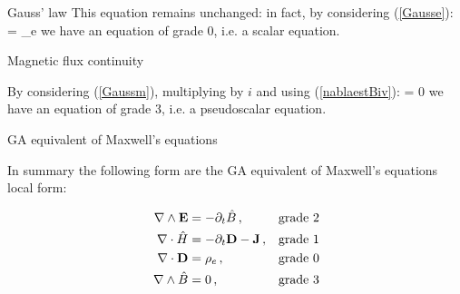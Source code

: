 \documentclass[handout,10pt]{beamer}
\begin{document}
\begin{frame}[fragile]{}
\alert{Gauss' law}
This equation remains unchanged: in fact, by considering (\ref{Gausse}):
%
\be
\nabla \cdot \BD =  \rho_e 
\ee
%
we have an \alert{equation of grade 0, i.e. a scalar equation}.

\pause
\alert{Magnetic flux continuity}

By considering (\ref{Gaussm}), multiplying by $i$ and using (\ref{nablaestBiv}):
%
\be
\nabla \wedge \hB =  0 
\ee
%
we have an \alert{equation of grade 3, i.e. a pseudoscalar equation}.

\end{frame}



\begin{frame}[fragile]{GA equivalent of Maxwell's equations}

In summary the following form are the GA equivalent of Maxwell's equations local form:

\begin{subequations}
\begin{align}
\nabla \wedge \mathbf{E} &= - \partial_t \hat{B} \, , &&\text{grade 2}  \label{FaradayGA} \\
\nabla \cdot \hat{H} &= - \partial_t \mathbf{D} - \mathbf{J}  \, , &&\text{grade 1} \label{AmpereGA} \\
\nabla \cdot \mathbf{D} &=  \rho_e  \, , &&\text{grade 0} \label{GausseGA} \\
\nabla \wedge \hat{B} &=  0 \, , &&\text{grade 3} \label{GaussmGA}
\end{align}
\end{subequations}


\end{frame}


\end{document}
